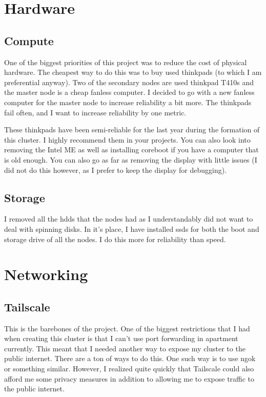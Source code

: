 \documentclass[12pt]{article}
\begin{document}
\section{Hardware}
\subsection{Compute}
One of the biggest priorities of this project was to reduce the cost of physical hardware. The cheapest way to do this was to buy used thinkpads (to which I am preferential anyway). Two of the secondary nodes are used thinkpad T410s and the master node is a cheap fanless computer. I decided to go with a new fanless computer for the master node to increase reliability a bit more. The thinkpads fail often, and I want to increase reliability by one metric.

These thinkpads have been semi-reliable for the last year during the formation of this cluster. I highly recommend them in your projects. You can also look into removing the Intel ME as well as installing coreboot if you have a computer that is old enough. You can also go as far as removing the display with little issues (I did not do this however, as I prefer to keep the display for debugging).

\subsection{Storage}
I removed all the hdds that the nodes had as I understandably did not want to deal with spinning disks. In it's place, I have installed ssds for both the boot and storage drive of all the nodes. I do this more for reliability than speed.

\section{Networking}
\subsection{Tailscale}
This is the barebones of the project. One of the biggest restrictions that I had when creating this cluster is that I can't use port forwarding in apartment currently. This meant that I needed another way to expose my cluster to the public internet. There are a ton of ways to do this. One such way is to use ngok or something similar. However, I realized quite quickly that Tailscale could also afford me some privacy measures in addition to allowing me to expose traffic to the public internet.
\end{document}
